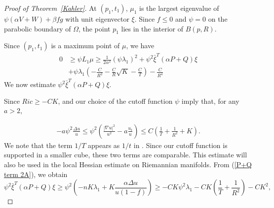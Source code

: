 \documentclass{amsart}
\theoremstyle{definition}
\theoremstyle{remark}
\numberwithin{equation}{section}
\begin{document}
\begin{proof}[Proof of Theorem~\ref{Kahler}]
At $(p_{1},t_{1})$, $\mu_1$ is the largest eigenvalue of $\psi(\alpha V+W)+\beta f g$ with unit eigenvector $\xi$. Since $f \leq 0$ and $\psi=0$ on the parabolic boundary of $\Omega$, the point $p_1$ lies in the interior of $B(p, R)$.

Since $\left(p_1, t_1\right)$ is a maximum point of $\mu$, we have
\[
\begin{aligned}
0 &\geq \psi L_1 \mu \geq \frac{1}{2\alpha^2}(\psi \lambda_1)^2+\psi^2 \bar{\xi}^T(\alpha P+Q) \xi \\
&+\psi \lambda_1(-\frac{C}{R^{2}}-\frac{C}{R}\sqrt{K}-\frac{C}{T})
-\frac{C}{R^{4}}
\end{aligned}
\]
We now estimate $\psi^2 \bar{\xi}^T(\alpha P+Q) \xi$.


Since $Ric \geq-CK$, \cite{Li-Yau} and our choice of the cutoff function $\psi$ imply that, for any $a>2$,

\begin{equation}\label{Li-Yau local}
\begin{aligned}
-a \psi^2 \frac{\Delta u}{u}\leq \psi^2\left(\frac{|\nabla u|^2}{u^2}-a \frac{u_t}{u}\right) \leq C\left(\frac{1}{T}+\frac{1}{R^2}+K\right) .
\end{aligned}
\end{equation}
We note that the term $1 / T$ appears as $1 / t$ in \cite{Li-Yau}. Since our cutoff function is supported in a smaller cube, these two terms are comparable. This estimate will also be used in the local Hessian estimate on Riemannian manifolds. 
From (\ref{P+Q term 2A}), we obtain 
\[
\psi^2 \bar{\xi}^T (\alpha P +Q)\xi \geq \psi^{2}(-nK\lambda_{1}+K\frac{\alpha \Delta u}{u(1-f)})\geq  -CK \psi^2 \lambda_1 - CK\left(\frac1T + \frac{1}{R^2}\right) -CK^2,
\]




\end{proof}
\end{document}

